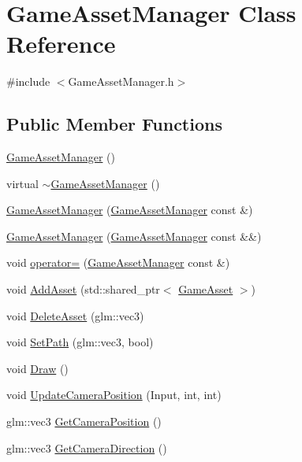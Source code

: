 \hypertarget{classGameAssetManager}{}\section{Game\+Asset\+Manager Class Reference}
\label{classGameAssetManager}


{\ttfamily \#include $<$Game\+Asset\+Manager.\+h$>$}

\subsection*{Public Member Functions}
\begin{DoxyCompactItemize}
\item 
\hyperlink{classGameAssetManager_a84d0445928649e0d1e0f8e31ee137b17}{Game\+Asset\+Manager} ()
\item 
virtual \hyperlink{classGameAssetManager_a1270bd61ecbcca563f079803e40c9b77}{$\sim$\+Game\+Asset\+Manager} ()
\item 
\hyperlink{classGameAssetManager_a2c9adcb72faa154c87eadc9bafe5269d}{Game\+Asset\+Manager} (\hyperlink{classGameAssetManager}{Game\+Asset\+Manager} const \&)
\item 
\hyperlink{classGameAssetManager_a44f6e2fd6b8ff1dd64e5697f1be7386d}{Game\+Asset\+Manager} (\hyperlink{classGameAssetManager}{Game\+Asset\+Manager} const \&\&)
\item 
void \hyperlink{classGameAssetManager_ac72678a4ad5378c685aa6bae84a4e712}{operator=} (\hyperlink{classGameAssetManager}{Game\+Asset\+Manager} const \&)
\item 
void \hyperlink{classGameAssetManager_ad3de8ff00d55ba04728b1de8213b2349}{Add\+Asset} (std\+::shared\+\_\+ptr$<$ \hyperlink{classGameAsset}{Game\+Asset} $>$)
\item 
void \hyperlink{classGameAssetManager_a0627c08b5696fac9ebf3076b5766599b}{Delete\+Asset} (glm\+::vec3)
\item 
void \hyperlink{classGameAssetManager_a7898abe62096f7de7d04e1e4c22f0f87}{Set\+Path} (glm\+::vec3, bool)
\item 
void \hyperlink{classGameAssetManager_a32837132bd70a9a9ed537323c2d3d886}{Draw} ()
\item 
void \hyperlink{classGameAssetManager_aeb9a8c013f49f2ab06a51b5033576061}{Update\+Camera\+Position} (Input, int, int)
\item 
glm\+::vec3 \hyperlink{classGameAssetManager_a1d9f1f5cc6630a10a0bf358dc2bcddef}{Get\+Camera\+Position} ()
\item 
glm\+::vec3 \hyperlink{classGameAssetManager_a236ee25b1346115f0ee68f1497b02e85}{Get\+Camera\+Direction} ()
\end{DoxyCompactItemize}
